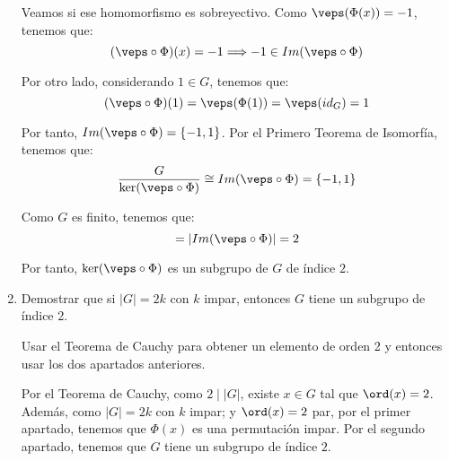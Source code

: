 \begin{ejercicio}
\begin{enumerate}
        Veamos si ese homomorfismo es sobreyectivo. Como $\veps(\Phi(x))=-1$, tenemos que:
        \begin{equation*}
            (\veps\circ\Phi)(x) = -1\Longrightarrow -1\in Im(\veps\circ\Phi)
        \end{equation*}

        Por otro lado, considerando $1\in G$, tenemos que:
        \begin{equation*}
            (\veps\circ\Phi)(1) = \veps(\Phi(1)) = \veps(id_{G}) = 1
        \end{equation*}

        Por tanto, $Im(\veps\circ\Phi)=\{-1, 1\}$. Por el Primero Teorema de Isomorfía, tenemos que:
        \begin{equation*}
            \dfrac{G}{\ker(\veps\circ\Phi)}\cong Im(\veps\circ\Phi) = \{-1, 1\}
        \end{equation*}

        Como $G$ es finito, tenemos que:
        \begin{equation*}
            [G:\ker(\veps\circ\Phi)] = |Im(\veps\circ\Phi)| = 2
        \end{equation*}

        Por tanto, $\ker(\veps\circ\Phi)$ es un subgrupo de $G$ de índice $2$.       

        \item Demostrar que si $|G| = 2k$ con $k$ impar, entonces $G$ tiene un subgrupo de índice 2.
        \begin{observacion}
            Usar el Teorema de Cauchy para obtener un elemento de orden 2 y entonces usar los dos apartados anteriores.
        \end{observacion}

        Por el Teorema de Cauchy, como $2\mid |G|$, existe $x\in G$ tal que $\ord(x)=2$. Además, como $|G|=2k$ con $k$ impar; y $\ord(x)=2$ par, por el primer apartado, tenemos que $\Phi(x)$ es una permutación impar. Por el segundo apartado, tenemos que $G$ tiene un subgrupo de índice $2$.
    \end{enumerate}
\end{ejercicio}

